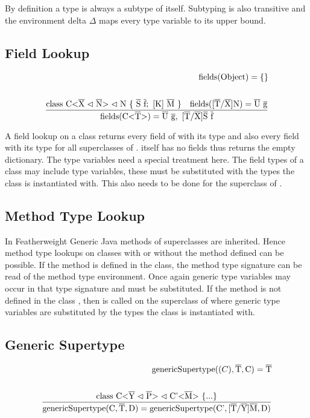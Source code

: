By definition a type is always a subtype of itself. Subtyping is also transitive and the environment delta $\Delta$ maps every type variable to its upper bound.

\subsection{Field Lookup}

\begin{align*}
    \text{fields}(\text{Object}) = \{\}\\
    \\
    \frac{\class{S}{f} \quad \text{fields}(\tsxsn{T}{X}{N}) = \ot{U} \ \ot{g} }{\text{fields}(\nvt{C}{T}) = \ot{U} \ \ot{g}, \ \tsxsns{T}{X}{S} \ \ot{f}}\\
\end{align*}

A field lookup on a class  returns every field of  with its type and also every field with its type for all superclasses of .  itself has no fields thus  returns the empty dictionary.
The type variables need a special treatment here. The field types of a class  may include type variables, these must be substituted with the types the class is instantiated with. This also needs to be done for the superclass of .

\subsection{Method Type Lookup}

In Featherweight Generic Java methods of superclasses are inherited. Hence method type lookups on classes with or without the method defined can be possible. If the method is defined in the class, the method type signature can be read of the method type environment. Once again generic type variables may occur in that type signature and must be substituted.
If the method is not defined in the class , then  is called on the superclass of  where generic type variables are substituted by the types the class  is instantiated with.

\subsection{Generic Supertype}

\begin{align*}
    \text{genericSupertype} (\text(C), \overline{\text{T}}, \text{C} ) = \overline{\text{T}}\\
    \\
    \frac{ \text{class} \ \text{C} \text{<} \overline{\text{Y}} \vartriangleleft \overline{\text{P}} \text{>} \vartriangleleft \text{C'<}\overline{\text{M}}\text{>} \ \{ ... \} }{ \text{genericSupertype} ( \text{C}, \overline{\text{T}}, \text{D} ) = \text{genericSupertype} ( \text{C'}, \text{[}\overline{\text{T}}/\overline{\text{Y}}\text{]}\overline{\text{M}}, \text{D} ) }\\
\end{align*}

